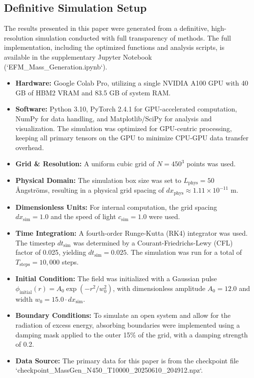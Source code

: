 \documentclass[11pt]{article}
\begin{document}
\subsection{Definitive Simulation Setup}
The results presented in this paper were generated from a definitive, high-resolution simulation conducted with full transparency of methods. The full implementation, including the optimized functions and analysis scripts, is available in the supplementary Jupyter Notebook (`EFM_Mass_Generation.ipynb`).
\begin{itemize}
    \item \textbf{Hardware:} Google Colab Pro, utilizing a single NVIDIA A100 GPU with 40 GB of HBM2 VRAM and 83.5 GB of system RAM.
    \item \textbf{Software:} Python 3.10, PyTorch 2.4.1 for GPU-accelerated computation, NumPy for data handling, and Matplotlib/SciPy for analysis and visualization. The simulation was optimized for GPU-centric processing, keeping all primary tensors on the GPU to minimize CPU-GPU data transfer overhead.
    \item \textbf{Grid \& Resolution:} A uniform cubic grid of \(N=450^3\) points was used.
    \item \textbf{Physical Domain:} The simulation box size was set to \(L_{\text{phys}} = 50\) Ångströms, resulting in a physical grid spacing of \(dx_{\text{phys}} \approx 1.11 \times 10^{-11}\) m.
    \item \textbf{Dimensionless Units:} For internal computation, the grid spacing \(dx_{\text{sim}} = 1.0\) and the speed of light \(c_{\text{sim}} = 1.0\) were used.
    \item \textbf{Time Integration:} A fourth-order Runge-Kutta (RK4) integrator was used. The timestep \(dt_{\text{sim}}\) was determined by a Courant-Friedrichs-Lewy (CFL) factor of 0.025, yielding \(dt_{\text{sim}} = 0.025\). The simulation was run for a total of \(T_{\text{steps}} = 10,000\) steps.
    \item \textbf{Initial Condition:} The field was initialized with a Gaussian pulse \(\phi_{\text{initial}}(r) = A_0 \exp(-r^2/w_0^2)\), with dimensionless amplitude \(A_0 = 12.0\) and width \(w_0 = 15.0 \cdot dx_{\text{sim}}\).
    \item \textbf{Boundary Conditions:} To simulate an open system and allow for the radiation of excess energy, absorbing boundaries were implemented using a damping mask applied to the outer 15\% of the grid, with a damping strength of 0.2.
    \item \textbf{Data Source:} The primary data for this paper is from the checkpoint file `checkpoint_MassGen_N450_T10000_20250610_204912.npz`.
\end{itemize}
\end{document}
